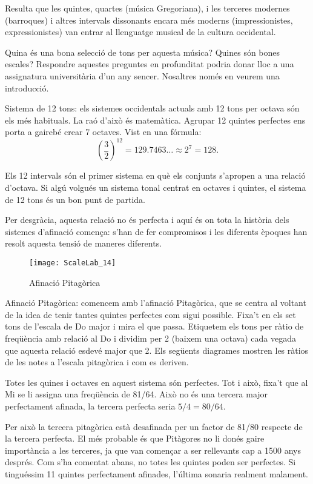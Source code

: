 Resulta que les quintes, quartes (música Gregoriana), i les terceres modernes (barroques) i altres intervals dissonants encara més moderns (impressionistes, expressionistes) van entrar al llenguatge musical de la cultura occidental.

Quina és una bona selecció de tons per aquesta música? Quines són bones escales? Respondre aquestes preguntes en profunditat podria donar lloc a una assignatura universitària d'un any sencer. Nosaltres només  en veurem una introducció.

Sistema de 12 tons: els sistemes occidentals actuals amb 12 tons per octava són els més habituals. La raó d'això és matemàtica. Agrupar 12 quintes perfectes ens porta a gairebé crear 7 octaves. Vist en una fórmula:
$$\left( \frac{3}{2}\right)^{12} = 129.7463 \ldots \approx 2^7 = 128 .$$

Els 12 intervals són el primer sistema en què els conjunts s'apropen a una relació d'octava. Si algú volgués un sistema tonal centrat en octaves i quintes, el sistema de 12 tons és un bon punt de partida.

Per desgràcia, aquesta relació no és perfecta i aquí és on tota la història dels sistemes d'afinació comença: s'han de fer compromisos i les diferents èpoques han resolt aquesta tensió de maneres diferents.

\begin{figure}[h]
\centering
\texttt{[image: ScaleLab\_14]}
\caption*{Afinació Pitagòrica}
\end{figure}

Afinació Pitagòrica: comencem amb l'afinació Pitagòrica, que se centra al voltant de la idea de tenir tantes quintes perfectes com sigui possible. Fixa't en els set tons de l'escala de Do major i mira el que passa. Etiquetem els tons per ràtio de freqüència amb relació al Do i dividim per 2 (baixem una octava) cada vegada que aquesta relació esdevé major que 2. Els següents diagrames mostren les ràtios de les notes a l'escala pitagòrica i com es deriven.

Totes les quines i octaves en aquest sistema són perfectes. Tot i això, fixa't que al Mi se li assigna una freqüència de 81/64. Això no és una tercera major perfectament afinada, la tercera perfecta seria $5/4=80/64$.

Per això la tercera pitagòrica està desafinada per un factor de 81/80 respecte de la tercera perfecta. El més probable és que Pitàgores no li donés gaire importància a les terceres, ja que van començar a ser rellevants cap a 1500 anys després. Com s'ha comentat abans, no totes les quintes poden ser perfectes. Si tinguéssim 11 quintes perfectament afinades, l'última sonaria realment malament.

